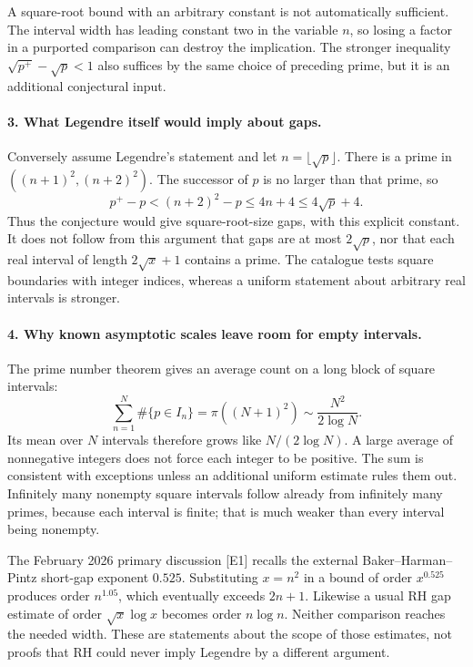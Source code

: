 \documentclass[11pt]{article}
\begin{document}
A square-root bound with an arbitrary constant is not automatically sufficient. The interval width has leading constant two in the variable $n$, so losing a factor in a purported comparison can destroy the implication. The stronger inequality $\sqrt{p^+}-\sqrt p<1$ also suffices by the same choice of preceding prime, but it is an additional conjectural input.

\paragraph{3. What Legendre itself would imply about gaps.}
Conversely assume Legendre's statement and let $n=\lfloor\sqrt p\rfloor$. There is a prime in $((n+1)^2,(n+2)^2)$. The successor of $p$ is no larger than that prime, so
\[
 p^+-p<(n+2)^2-p\le4n+4\le4\sqrt p+4.
\]
Thus the conjecture would give square-root-size gaps, with this explicit constant. It does not follow from this argument that gaps are at most $2\sqrt p$, nor that each real interval of length $2\sqrt x+1$ contains a prime. The catalogue tests square boundaries with integer indices, whereas a uniform statement about arbitrary real intervals is stronger.

\paragraph{4. Why known asymptotic scales leave room for empty intervals.}
The prime number theorem gives an average count on a long block of square intervals:
\[
 \sum_{n=1}^N\#\{p\in I_n\}
 =\pi((N+1)^2)\sim\frac{N^2}{2\log N}.
\]
Its mean over $N$ intervals therefore grows like $N/(2\log N)$. A large average of nonnegative integers does not force each integer to be positive. The sum is consistent with exceptions unless an additional uniform estimate rules them out. Infinitely many nonempty square intervals follow already from infinitely many primes, because each interval is finite; that is much weaker than every interval being nonempty.

The February 2026 primary discussion [E1] recalls the external Baker--Harman--Pintz short-gap exponent $0.525$. Substituting $x=n^2$ in a bound of order $x^{0.525}$ produces order $n^{1.05}$, which eventually exceeds $2n+1$. Likewise a usual RH gap estimate of order $\sqrt x\log x$ becomes order $n\log n$. Neither comparison reaches the needed width. These are statements about the scope of those estimates, not proofs that RH could never imply Legendre by a different argument.
\end{document}
